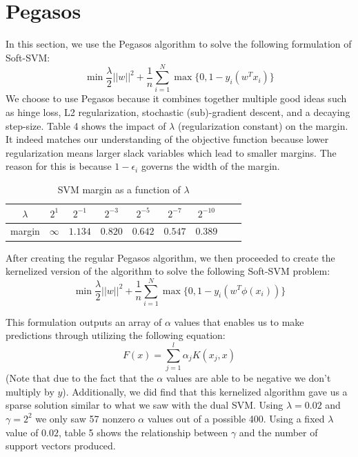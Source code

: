 \documentclass{article}
\begin{document}
\section{Pegasos}

In this section, we use the Pegasos algorithm to solve the following formulation of Soft-SVM:
$$\min \frac{\lambda}{2} ||w||^2 + \frac{1}{n} \sum_{i=1}^{N}  \max \{0,1 - y_i(w^T x_i)\}$$
We choose to use Pegasos because it combines together multiple good ideas such as hinge loss, L2 regularization, stochastic (sub)-gradient descent, and a decaying step-size. Table 4 shows the impact of $\lambda$ (regularization constant) on the margin. It indeed matches our understanding of the objective function because lower regularization means larger slack variables which lead to smaller margins. The reason for this is because $1-\epsilon_i$ governs the width of the margin.

\begin{table}
  \begin{center}
    \begin{tabular}{ | c | c | c | c | c | c | c | c | c |}
      \hline
       $\lambda$& $2^1$       & $2^{-1}$&  $2^{-3}$& $2^{-5}$&  $2^{-7}$&  $2^{-10}$ \\ \hline
       margin       & $\infty$     & $1.134$&   $0.820$& $0.642$&  $0.547$&   $0.389$  \\ \hline

    \end{tabular}
  \end{center}
  \caption{SVM margin as a function of $\lambda$}
\end{table}

After creating the regular Pegasos algorithm, we then proceeded to create the kernelized version of the algorithm to solve the following Soft-SVM problem:
$$\min \frac{\lambda}{2} ||w||^2 + \frac{1}{n} \sum_{i=1}^{N}  \max \{0,1 - y_i(w^T \phi(x_i))\}$$

This formulation outputs an array of $\alpha$ values that enables us to make predictions through utilizing the following equation:
$$F(x) = \sum_{j=1}^{l} \alpha_jK(x_j,x)$$
(Note that due to the fact that the $\alpha$ values are able to be negative we don't multiply by $y$). Additionally, we did find that this kernelized algorithm gave us a sparse solution similar to what we saw with the dual SVM. Using $\lambda = 0.02$ and $\gamma = 2^2$ we only saw 57 nonzero $\alpha$ values out of a possible 400. Using a fixed $\lambda$ value of $0.02$, table 5 shows the relationship between $\gamma$ and the number of support vectors produced.
\end{document}
